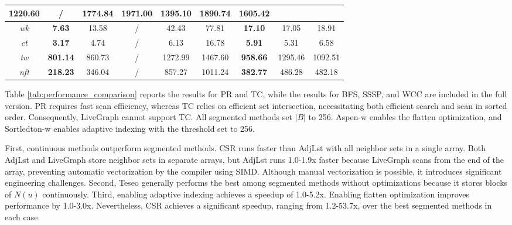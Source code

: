 \begin{table}[h!]
\begin{tabular}{|c|ccc|ccccc|}
  \multicolumn{1}{c|}{1220.60} &
  / &
  \multicolumn{1}{c|}{1774.84} &
  \multicolumn{1}{c|}{1971.00} &
  \multicolumn{1}{c|}{\textbf{1395.10}} &
  \multicolumn{1}{c|}{1890.74} &
  1605.42 \\ \hline
\emph{wk} &
  \multicolumn{1}{c|}{\textbf{7.63}} &
  \multicolumn{1}{c|}{13.58} &
  / &
  \multicolumn{1}{c|}{42.43} &
  \multicolumn{1}{c|}{77.81} &
  \multicolumn{1}{c|}{\textbf{17.10}} &
  \multicolumn{1}{c|}{17.05} &
  18.91 \\ \hline
\emph{ct} &
  \multicolumn{1}{c|}{\textbf{3.17}} &
  \multicolumn{1}{c|}{4.74} &
  / &
  \multicolumn{1}{c|}{6.13} &
  \multicolumn{1}{c|}{16.78} &
  \multicolumn{1}{c|}{\textbf{5.91}} &
  \multicolumn{1}{c|}{5.31} &
  6.58 \\ \hline
\emph{tw} &
  \multicolumn{1}{c|}{\textbf{801.14}} &
  \multicolumn{1}{c|}{860.73} &
  / &
  \multicolumn{1}{c|}{1272.99} &
  \multicolumn{1}{c|}{1467.60} &
  \multicolumn{1}{c|}{\textbf{958.66}} &
  \multicolumn{1}{c|}{1295.46} &
  1092.51 \\ \hline
\emph{nft} &
  \multicolumn{1}{c|}{\textbf{218.23}} &
  \multicolumn{1}{c|}{346.04} &
  / &
  \multicolumn{1}{c|}{857.27} &
  \multicolumn{1}{c|}{1011.24} &
  \multicolumn{1}{c|}{\textbf{382.77}} &
  \multicolumn{1}{c|}{486.28} &
  482.18 \\ \hline
\end{tabular}

\end{table}




Table \ref{tab:performance_comparison} reports the results for PR and TC, while the results for BFS, SSSP, and WCC are included in the full version. PR requires fast scan efficiency, whereas TC relies on efficient set intersection, necessitating both efficient search and scan in sorted order. Consequently, LiveGraph cannot support TC. All segmented methods set $|B|$ to 256. Aspen-w enables the flatten optimization, and Sortledton-w enables adaptive indexing with the threshold set to 256.

First, continuous methods outperform segmented methods. CSR runs faster than AdjLst with all neighbor sets in a single array. Both AdjLst and LiveGraph store neighbor sets in separate arrays, but AdjLst runs 1.0-1.9x faster because LiveGraph scans from the end of the array, preventing automatic vectorization by the compiler using SIMD. Although manual vectorization is possible, it introduces significant engineering challenges. Second, Teseo generally performs the best among segmented methods without optimizations because it stores blocks of $N(u)$ continuously. Third, enabling adaptive indexing achieves a speedup of 1.0-5.2x. Enabling flatten optimization improves performance by 1.0-3.0x. Nevertheless, CSR achieves a significant speedup, ranging from 1.2-53.7x, over the best segmented methods in each case.

